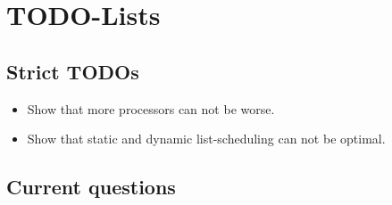 \documentclass[a4paper, 10pt]{report}
\begin{document}
\chapter{TODO-Lists}
\label{chap:todo}

\section{Strict TODOs}
\label{sec:strict-todos}

\begin{itemize}
\item Show that more processors can not be worse.
\item Show that static and dynamic list-scheduling can not be optimal.\done{}
\end{itemize}

\section{Current questions}
\label{chap:current-questions}
\end{document}
